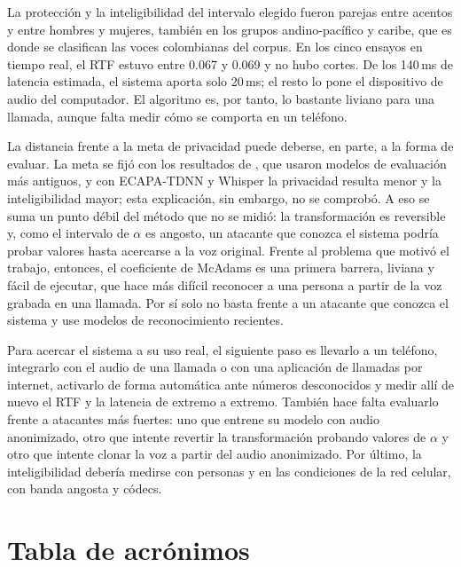 \documentclass[10pt,twocolumn]{article}
\newcommand{\textcite}[1]{\citet{#1}}
\begin{document}
La protección y la inteligibilidad del intervalo elegido fueron parejas entre acentos y entre hombres y mujeres, también en los grupos andino-pacífico y caribe, que es donde se clasifican las voces colombianas del corpus. En los cinco ensayos en tiempo real, el RTF estuvo entre 0.067 y 0.069 y no hubo cortes. De los 140\,ms de latencia estimada, el sistema aporta solo 20\,ms; el resto lo pone el dispositivo de audio del computador. El algoritmo es, por tanto, lo bastante liviano para una llamada, aunque falta medir cómo se comporta en un teléfono.

La distancia frente a la meta de privacidad puede deberse, en parte, a la forma de evaluar. La meta se fijó con los resultados de \textcite{patino2021}, que usaron modelos de evaluación más antiguos, y con ECAPA-TDNN y Whisper la privacidad resulta menor y la inteligibilidad mayor; esta explicación, sin embargo, no se comprobó. A eso se suma un punto débil del método que no se midió: la transformación es reversible y, como el intervalo de $\alpha$ es angosto, un atacante que conozca el sistema podría probar valores hasta acercarse a la voz original. Frente al problema que motivó el trabajo, entonces, el coeficiente de McAdams es una primera barrera, liviana y fácil de ejecutar, que hace más difícil reconocer a una persona a partir de la voz grabada en una llamada. Por sí solo no basta frente a un atacante que conozca el sistema y use modelos de reconocimiento recientes.

Para acercar el sistema a su uso real, el siguiente paso es llevarlo a un teléfono, integrarlo con el audio de una llamada o con una aplicación de llamadas por internet, activarlo de forma automática ante números desconocidos y medir allí de nuevo el RTF y la latencia de extremo a extremo. También hace falta evaluarlo frente a atacantes más fuertes: uno que entrene su modelo con audio anonimizado, otro que intente revertir la transformación probando valores de $\alpha$ y otro que intente clonar la voz a partir del audio anonimizado. Por último, la inteligibilidad debería medirse con personas y en las condiciones de la red celular, con banda angosta y códecs.


\section*{Tabla de acrónimos}
\end{document}

